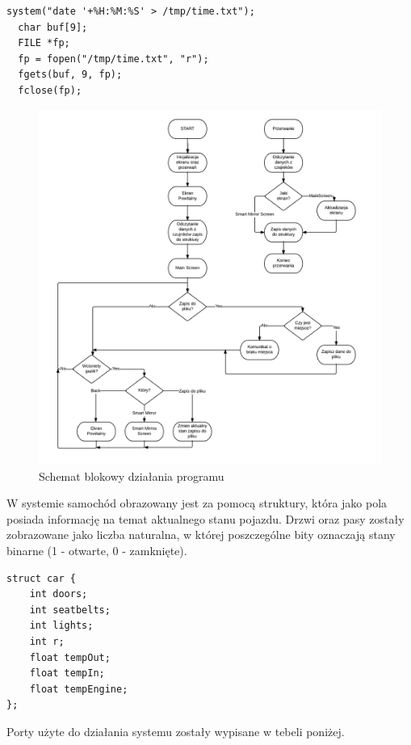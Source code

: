 \documentclass{xmgr}
\begin{document}
\begin{lstlisting}[label=bot-dirs-alg,caption=Odczyt aktualnej daty]
  system("date '+%H:%M:%S' > /tmp/time.txt");
  char buf[9];
  FILE *fp;
  fp = fopen("/tmp/time.txt", "r");
  fgets(buf, 9, fp);
  fclose(fp);
\end{lstlisting}

\begin{figure}[!h]
    \centering
    	\includegraphics[height=0.6\textheight]{images/codeDiagram.png}
    \caption{Schemat blokowy działania programu}
\end{figure}

W systemie samochód obrazowany jest za pomocą struktury, która jako pola posiada informację na temat aktualnego stanu pojazdu. Drzwi oraz pasy zostały zobrazowane jako liczba naturalna, w której poszczególne bity oznaczają stany binarne (1 - otwarte, 0 - zamknięte).

\begin{lstlisting}[label=bot-dirs-alg,caption=Struktura samochodu w programie]
struct car {
	int doors;
 	int seatbelts;
 	int lights;         
 	int r;
 	float tempOut;
 	float tempIn;
 	float tempEngine;
};
\end{lstlisting}

Porty użyte do działania systemu zostały wypisane w tebeli poniżej.
\end{document}
